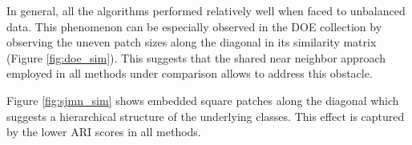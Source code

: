 \documentclass[a4paper]{article}
\begin{document}
In general, all the algorithms performed relatively well when faced to unbalanced data. This phenomenon can be especially observed in the DOE collection by observing the uneven patch sizes along the diagonal in its similarity matrix (Figure \ref{fig:doe_sim}). This suggests that the shared near neighbor approach employed in all methods under comparison allows to address this obstacle.


Figure \ref{fig:sjmn_sim} shows embedded square patches along the diagonal which suggests a hierarchical structure of the underlying classes. This effect is captured by the lower ARI scores in all methods.


\end{document}
